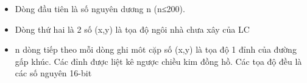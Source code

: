 \begin{itemize}
	\item     Dòng đầu tiên là số nguyên dương n (n≤200).   
	\item     Dòng thứ hai là 2 số (x,y) là tọa độ ngôi nhà chưa xây của LC   
	\item     n dòng tiếp theo mỗi dòng ghi môt cặp số (x,y) là tọa độ 1 đỉnh của đường gấp khúc. Các đỉnh được liệt kê ngược chiều kim đồng hồ. Các tọa độ đều là các số nguyên 16-bit   
\end{itemize}